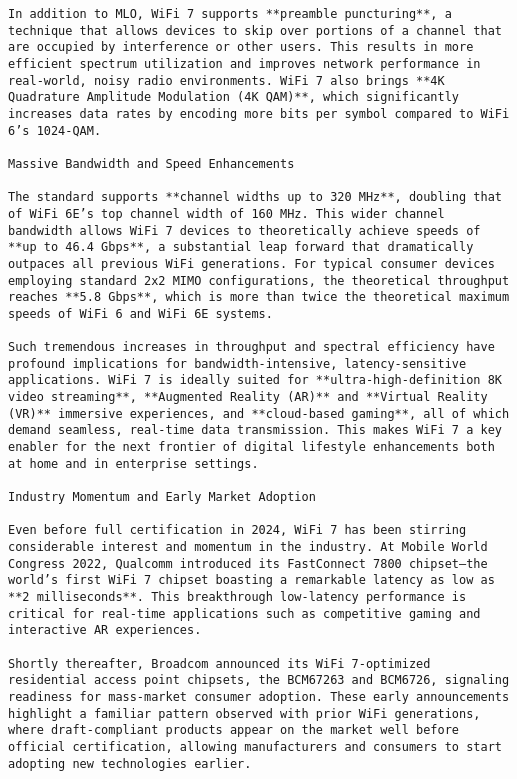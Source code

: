 \begin{verbatim}
In addition to MLO, WiFi 7 supports **preamble puncturing**, a technique that allows devices to skip over portions of a channel that are occupied by interference or other users. This results in more efficient spectrum utilization and improves network performance in real-world, noisy radio environments. WiFi 7 also brings **4K Quadrature Amplitude Modulation (4K QAM)**, which significantly increases data rates by encoding more bits per symbol compared to WiFi 6’s 1024-QAM.

Massive Bandwidth and Speed Enhancements

The standard supports **channel widths up to 320 MHz**, doubling that of WiFi 6E’s top channel width of 160 MHz. This wider channel bandwidth allows WiFi 7 devices to theoretically achieve speeds of **up to 46.4 Gbps**, a substantial leap forward that dramatically outpaces all previous WiFi generations. For typical consumer devices employing standard 2x2 MIMO configurations, the theoretical throughput reaches **5.8 Gbps**, which is more than twice the theoretical maximum speeds of WiFi 6 and WiFi 6E systems.

Such tremendous increases in throughput and spectral efficiency have profound implications for bandwidth-intensive, latency-sensitive applications. WiFi 7 is ideally suited for **ultra-high-definition 8K video streaming**, **Augmented Reality (AR)** and **Virtual Reality (VR)** immersive experiences, and **cloud-based gaming**, all of which demand seamless, real-time data transmission. This makes WiFi 7 a key enabler for the next frontier of digital lifestyle enhancements both at home and in enterprise settings.

Industry Momentum and Early Market Adoption

Even before full certification in 2024, WiFi 7 has been stirring considerable interest and momentum in the industry. At Mobile World Congress 2022, Qualcomm introduced its FastConnect 7800 chipset—the world’s first WiFi 7 chipset boasting a remarkable latency as low as **2 milliseconds**. This breakthrough low-latency performance is critical for real-time applications such as competitive gaming and interactive AR experiences.

Shortly thereafter, Broadcom announced its WiFi 7-optimized residential access point chipsets, the BCM67263 and BCM6726, signaling readiness for mass-market consumer adoption. These early announcements highlight a familiar pattern observed with prior WiFi generations, where draft-compliant products appear on the market well before official certification, allowing manufacturers and consumers to start adopting new technologies earlier.


\end{verbatim}
